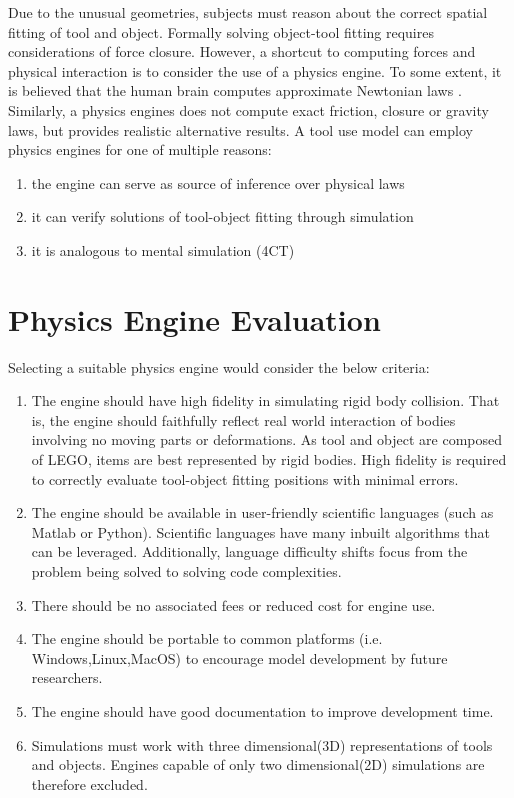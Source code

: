 \documentclass[11]{article}
\begin{document}
Due to the unusual geometries, subjects must reason about the correct spatial fitting of tool and object.    
Formally solving object-tool fitting requires considerations of force closure.
However, a shortcut to computing forces and physical interaction is to consider the use of a physics engine. 
To some extent, it is believed that the human brain computes approximate Newtonian laws \cite{battaglia2013}. 
Similarly, a physics engines does not compute exact friction, closure or gravity laws, but provides realistic alternative results. 
A tool use model can employ physics engines for one of multiple reasons:
\begin{enumerate}
      \item the engine can serve as source of inference over physical laws   
      \item it can verify solutions of tool-object fitting through simulation
      \item it is analogous to mental simulation (4CT)
\end{enumerate}

\section{Physics Engine Evaluation}
Selecting a suitable physics engine would consider the below criteria: 
\begin{enumerate}
    \item The engine should have high fidelity in simulating rigid body collision. 
      That is, the engine should faithfully reflect real world interaction of bodies involving no moving parts or deformations.
      As tool and object are composed of LEGO, items are best represented by rigid bodies.   
      High fidelity is required to correctly evaluate tool-object fitting positions with minimal errors.
    \item The engine should be available in user-friendly scientific languages (such as Matlab or Python). 
      Scientific languages have many inbuilt algorithms that can be leveraged.
      Additionally, language difficulty shifts focus from the problem being solved to solving code complexities.
    \item There should be no associated fees or reduced cost for engine use.
    \item The engine should be portable to common platforms (i.e. Windows,Linux,MacOS) to encourage model development by future researchers.
    \item The engine should have good documentation to improve development time.
    \item Simulations must work with three dimensional(3D) representations of tools and objects.
      Engines capable of only two dimensional(2D) simulations are therefore excluded.  
\end{enumerate}
\end{document}
